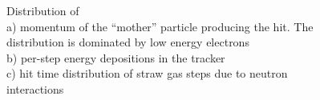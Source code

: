 \documentclass[12pt]{article}
\begin{document}
\begin{figure}[H]
  \caption{
    \label{figure:figure_00021}
    Distribution of \\
    a) momentum of the ``mother'' particle producing the hit.
    The distribution is dominated by low energy electrons \\
    b) per-step energy depositions in the tracker \\
    c) hit time distribution of straw gas steps due to neutron interactions
  }
\end{figure}
\end{document}
